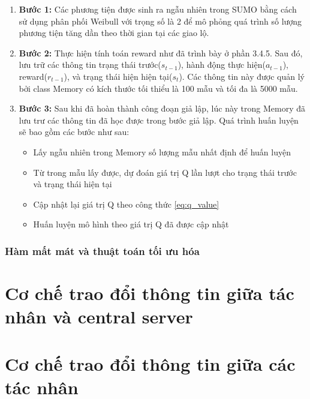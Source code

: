 \begin{enumerate}
    \item \textbf{Bước 1:} Các phương tiện được sinh ra ngẫu nhiên trong SUMO bằng cách sử dụng phân phối Weibull với trọng số là 2 để mô phỏng quá trình số lượng phương tiện tăng dần theo thời gian tại các giao lộ.
    \item \textbf{Bước 2:} Thực hiện tính toán reward như đã trình bày ở phần 3.4.5. Sau đó, lưu trữ các thông tin trạng thái trước($s_{t-1}$), hành động thực hiện($a_{t-1}$), reward($r_{t-1}$), và trạng thái hiện hiện tại($s_t$). Các thông tin này được quản lý bởi class Memory có kích thước tối thiểu là 100 mẫu và tối đa là 5000 mẫu.
    \item \textbf{Bước 3:} Sau khi đã hoàn thành công đoạn giả lập, lúc này trong Memory đã lưu trư các thông tin đã học được trong bước giả lập. Quá trình huấn luyện sẽ bao gồm các bước như sau:
    \begin{itemize}
        \item Lấy ngẫu nhiên trong Memory số lượng mẫu nhất định để huấn luyện
        \item Từ trong mẫu lấy được, dự đoán giá trị Q lần lượt cho trạng thái trước và trạng thái hiện tại
        \item Cập nhật lại giá trị Q theo công thức \ref{eq:q_value}
        \item Huấn luyện mô hình theo giá trị Q đã được cập nhật 
    \end{itemize}
\end{enumerate}

\subsubsection{Hàm mất mát và thuật toán tối ưu hóa}


\section{Cơ chế trao đổi thông tin giữa tác nhân và central server}



\section{Cơ chế trao đổi thông tin giữa các tác nhân}




